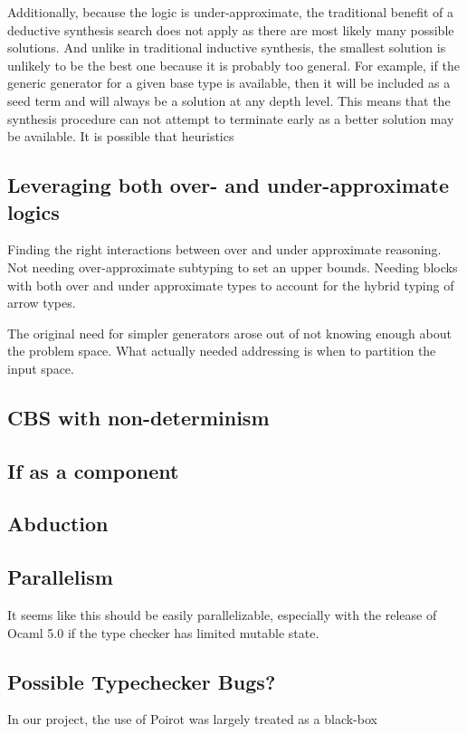 \documentclass[review, sigplan]{acmart}
\begin{document}
Additionally, because the logic is under-approximate, the traditional benefit of
a deductive synthesis search does not apply as there are most likely many
possible solutions. And unlike in traditional inductive synthesis, the smallest
solution is unlikely to be the best one because it is probably too general. For
example, if the generic generator for a given base type is available, then it
will be included as a seed term and will always be a solution at any depth
level. This means that the synthesis procedure can not attempt to terminate
early as a better solution may be available. It is possible that heuristics

\subsection{Leveraging both over- and under-approximate logics}
Finding the right interactions between over and under approximate reasoning. Not
needing over-approximate subtyping to set an upper bounds. Needing blocks with
both over and under approximate types to account for the hybrid typing of arrow
types.

The original need for simpler generators arose out of not knowing enough about
the problem space. What actually needed addressing is when to partition the
input space.

\subsection{CBS with non-determinism}

\subsection{If as a component}

\subsection{Abduction}

\subsection{Parallelism}
It seems like this should be easily parallelizable, especially with the release
of Ocaml 5.0 if the type checker has limited mutable state.

\subsection{Possible Typechecker Bugs?}
In our project, the use of Poirot was largely treated as a black-box
\end{document}
